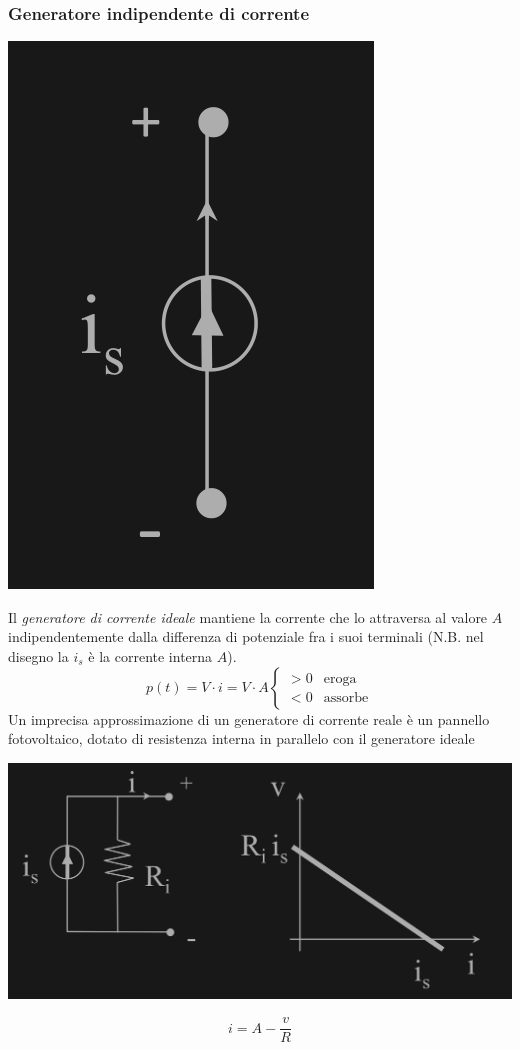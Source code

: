 \documentclass{article}
\begin{document}
\subsubsection{Generatore indipendente di corrente}
\begin{center}
    \includegraphics[scale=0.23]{Image/Gen corrente ideale.png}
\end{center}
Il \textit{generatore di corrente ideale} mantiene
la corrente che lo attraversa al valore $ A $ indipendentemente dalla
differenza di potenziale fra i suoi terminali (N.B. nel disegno la $i_s$ è la corrente interna $A$).
\[
    p(t) = V \cdot i = V \cdot A 
    \begin{cases}
        >0 &\text{eroga}\\
        <0 &\text{assorbe}
    \end{cases}
\]
Un imprecisa approssimazione di un generatore di corrente reale è un pannello fotovoltaico, dotato di resistenza interna in parallelo con il generatore ideale
\begin{center}
    \includegraphics[scale=0.2]{Image/Gen corrente reale.png}
\end{center}
\[
    i = A -\frac{v}{R}
\]
\end{document}
